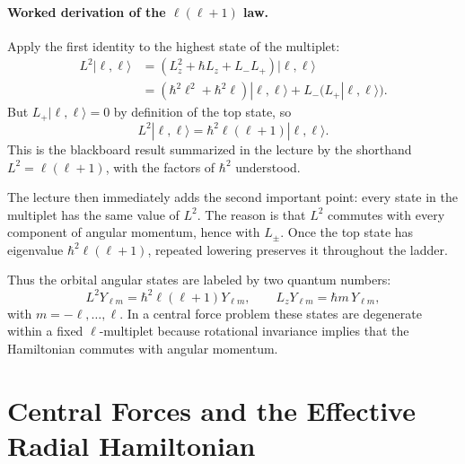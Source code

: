 \paragraph{Worked derivation of the \(\ell(\ell+1)\) law.}
Apply the first identity to the highest state of the multiplet:
\begin{align}
L^2|\ell,\ell\rangle
&=\left(L_z^2+\hbar L_z+L_-L_+\right)|\ell,\ell\rangle \\
&=\left(\hbar^2\ell^2+\hbar^2\ell\right)|\ell,\ell\rangle
+L_-\bigl(L_+|\ell,\ell\rangle\bigr).
\end{align}
But \(L_+|\ell,\ell\rangle=0\) by definition of the top state, so
\begin{equation}
L^2|\ell,\ell\rangle=\hbar^2\ell(\ell+1)|\ell,\ell\rangle.
\end{equation}
This is the blackboard result summarized in the lecture by the shorthand \(L^2=\ell(\ell+1)\), with the factors of \(\hbar^2\) understood.

The lecture then immediately adds the second important point: every state in the multiplet has the same value of \(L^2\). The reason is that \(L^2\) commutes with every component of angular momentum, hence with \(L_\pm\). Once the top state has eigenvalue \(\hbar^2\ell(\ell+1)\), repeated lowering preserves it throughout the ladder.

Thus the orbital angular states are labeled by two quantum numbers:
\begin{equation}
L^2Y_{\ell m}=\hbar^2\ell(\ell+1)Y_{\ell m},\qquad
L_zY_{\ell m}=\hbar m\,Y_{\ell m},
\end{equation}
with \(m=-\ell,\dots,\ell\). In a central force problem these states are degenerate within a fixed \(\ell\)-multiplet because rotational invariance implies that the Hamiltonian commutes with angular momentum.

\section{Central Forces and the Effective Radial Hamiltonian}

